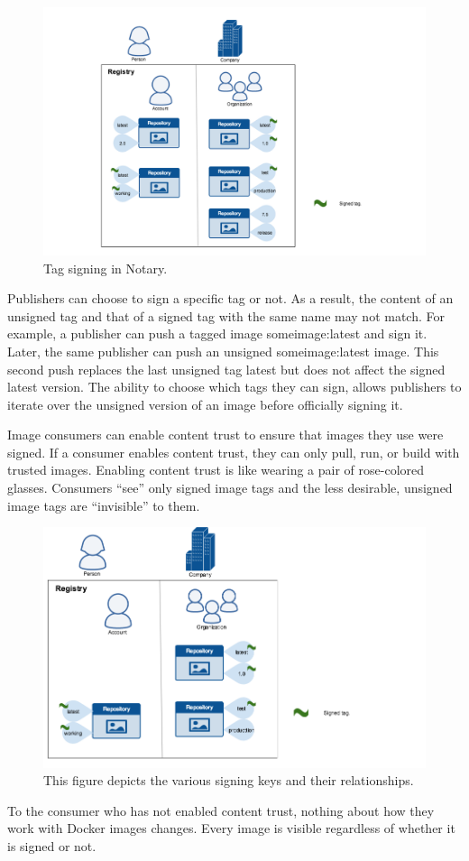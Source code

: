 \begin{figure}[t]
  \center{}
  \includegraphics[width=.5\textwidth]{images/notary_tag_signing.png}
  \caption{Tag signing in Notary.
  \label{fig-notary-tag-signing} }
\end{figure}

Publishers can choose to sign a specific tag or not. As a result, the
content of an unsigned tag and that of a signed tag with the same name may
not match. For example, a publisher can push a tagged image
someimage:latest and sign it. Later, the same publisher can push an
unsigned someimage:latest image. This second push replaces the last
unsigned tag latest but does not affect the signed latest version. The
ability to choose which tags they can sign, allows publishers to iterate
over the unsigned version of an image before officially signing it.

Image consumers can enable content trust to ensure that images they use
were signed. If a consumer enables content trust, they can only pull, run,
or build with trusted images. Enabling content trust is like wearing a pair
of rose-colored glasses. Consumers “see” only signed image tags and the
less desirable, unsigned image tags are “invisible” to them.

\begin{figure}[t]
  \center{}
  \includegraphics[width=.5\textwidth]{images/notary_trust_view.png}
  \caption{
This figure depicts the various signing keys and their
relationships.  
  \label{fig-notary-trust-view} }
\end{figure}

To the consumer who has not enabled content trust, nothing about how they
work with Docker images changes. Every image is visible regardless of
whether it is signed or not.

